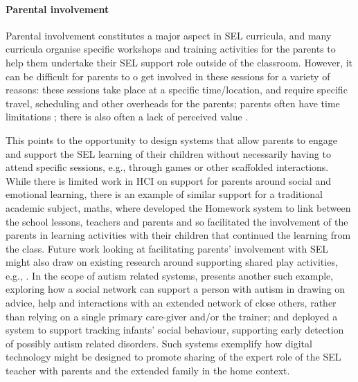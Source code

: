 \documentclass[prodmode,acmtochi]{acmsmall}
\begin{document}
\paragraph{Parental involvement}				Parental involvement  constitutes a major aspect in SEL curricula, and many curricula organise specific workshops and training activities for the parents to help them undertake their SEL support role outside of the classroom. However, it can be difficult for parents to o get involved in these sessions for a variety of reasons: these sessions take place at a specific time/location, and require specific travel, scheduling and other overheads for the parents; parents often have time limitations \cite{Bender2011}; there is also often a lack of perceived value \cite{Lewin2010}. 

This points to the opportunity to design systems that allow parents to engage and support the SEL learning of their children without necessarily having to attend specific sessions, e.g., through games or other scaffolded interactions. While there is limited work in HCI on support for parents around social and emotional learning, there is an example of similar support for a traditional academic subject, maths,  where   developed the Homework system to link between the school lessons, teachers and parents and so facilitated the involvement of the parents in learning activities with their children that continued the learning from the class. Future work looking at facilitating parents' involvement with SEL might also draw on existing research around supporting shared play activities, e.g., \cite{Raffle2010}. In the scope of autism related systems,  presents another such example, exploring how a social network can support a person with autism in drawing on advice, help and interactions with an extended network of close others, rather than relying on a single primary care-giver and/or the trainer; and  deployed a system to support tracking infants' social behaviour, supporting early detection of possibly autism related disorders. Such systems exemplify how digital technology might be designed to promote sharing of the expert role of the SEL teacher with parents and the extended family in the home context. 

\end{document}
